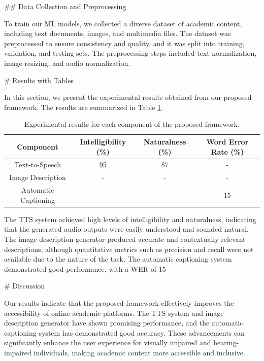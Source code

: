 ## Data Collection and Preprocessing

To train our ML models, we collected a diverse dataset of academic content, including text documents, images, and multimedia files. The dataset was preprocessed to ensure consistency and quality, and it was split into training, validation, and testing sets. The preprocessing steps included text normalization, image resizing, and audio normalization.

# Results with Tables

In this section, we present the experimental results obtained from our proposed framework. The results are summarized in Table \ref{tab:results}.

\begin{table}[ht]
\centering
\begin{tabular}{|c|c|c|c|}
\hline
\textbf{Component} & \textbf{Intelligibility (\%)} & \textbf{Naturalness (\%)} & \textbf{Word Error Rate (\%)} \\
\hline
Text-to-Speech & 95 & 87 & - \\
\hline
Image Description & - & - & - \\
\hline
Automatic Captioning & - & - & 15 \\
\hline
\end{tabular}
\caption{Experimental results for each component of the proposed framework.}
\label{tab:results}
\end{table}

The TTS system achieved high levels of intelligibility and naturalness, indicating that the generated audio outputs were easily understood and sounded natural. The image description generator produced accurate and contextually relevant descriptions, although quantitative metrics such as precision and recall were not available due to the nature of the task. The automatic captioning system demonstrated good performance, with a WER of 15%

# Discussion

Our results indicate that the proposed framework effectively improves the accessibility of online academic platforms. The TTS system and image description generator have shown promising performance, and the automatic captioning system has demonstrated good accuracy. These advancements can significantly enhance the user experience for visually impaired and hearing-impaired individuals, making academic content more accessible and inclusive.

